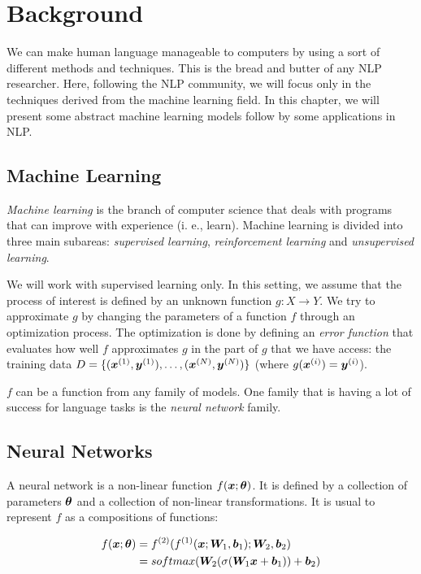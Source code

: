 \chapter{Background}
\label{ch:02-background}

We can make human language manageable to computers by using a sort of different methods and techniques. This is the bread and butter of any NLP researcher. Here, following the NLP community, we will focus only in the techniques derived from the machine learning field. In this chapter, we will present some abstract machine learning models follow by some applications in NLP. 

\section{Machine Learning}

\textit{Machine learning} is the branch of computer science that deals with programs that can improve with experience (i. e., learn). Machine learning is divided into three main subareas: \textit{supervised learning}, \textit{reinforcement learning} and \textit{unsupervised learning}.

We will work with supervised learning only. In this setting, we assume that the process of interest is defined by an unknown function $g:X\rightarrow Y$. We try to approximate $g$ by changing the parameters of a function $f$ through an optimization process. The optimization is done by defining an \textit{error function} that evaluates how well $f$ approximates $g$ in the part of $g$ that we have access: the training data $D = \{(\bm{x}^{(1)}, \bm{y}^{(1)}), \dots ,(\bm{x}^{(N)}, \bm{y}^{(N)})\}$ (where $g(\bm{x}^{(i)})=\bm{y}^{(i)}$).


$f$ can be a function from any family of models. One family that is having a lot of success for language tasks is the \textit{neural network} family.

\section{Neural Networks}

A neural network is a non-linear function $f(\bm{x}; \bm{\theta})$. It is defined by a collection of parameters $\bm{\theta}$ and a collection of non-linear transformations. It is usual to represent $f$ as a compositions of functions:

\begin{align}
f(\bm{x}; \bm{\theta}) &= f^{(2)}(f^{(1)}(\bm{x}; \bm{W}_1, \bm{b}_1); \bm{W}_2, \bm{b}_2)\\
&= softmax(\bm{W}_2 (\sigma(\bm{W}_1\bm{x} + \bm{b}_1)) + \bm{b}_2)
\end{align}


